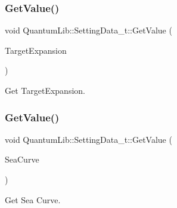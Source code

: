\subsubsection{\texorpdfstring{Get\+Value()}{GetValue()}\hspace{0.1cm}{\footnotesize\ttfamily [17/26]}}
{\footnotesize\ttfamily void Quantum\+Lib\+::\+Setting\+Data\+\_\+t\+::\+Get\+Value (\begin{DoxyParamCaption}\item[{\mbox{\hyperlink{namespace_quantum_lib_affbc8bc0775b14917688e0e6d2fab0fb}{e\+Target\+Expansion\+\_\+t}} \&}]{Target\+Expansion }\end{DoxyParamCaption})\hspace{0.3cm}{\ttfamily [inline]}}



Get Target\+Expansion. 

\mbox{\label{struct_quantum_lib_1_1_setting_data__t_a4024e847bab2f1d9d418dc562231bae2}} 
\subsubsection{\texorpdfstring{Get\+Value()}{GetValue()}\hspace{0.1cm}{\footnotesize\ttfamily [18/26]}}
{\footnotesize\ttfamily void Quantum\+Lib\+::\+Setting\+Data\+\_\+t\+::\+Get\+Value (\begin{DoxyParamCaption}\item[{\mbox{\hyperlink{namespace_quantum_lib_aeaeea421c9323b85e6b45fa78e3b2a06}{e\+Sea\+Curve\+\_\+t}} \&}]{Sea\+Curve }\end{DoxyParamCaption})\hspace{0.3cm}{\ttfamily [inline]}}



Get Sea Curve. 

\mbox{\label{struct_quantum_lib_1_1_setting_data__t_a37296c7511b7739913035eb2920f6f4b}} 
